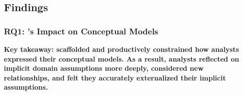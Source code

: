 \begin{comment}

\subsubsection{\evalStatisticalModels}
We used AIC, BIC, and R-squared values to assess how well statistical models
authored with vs. without rTisane fit the data. We used rTisane to statistically
model and assess the influence of rTisane on AIC, BIC, and R-squared values.

We also thematically analyzed participants' reactions to the similarities,
differences, and surprises between statistical models. 

\end{comment}

\subsection{Findings}
\subsubsection{RQ1: \rTisane's Impact on Conceptual Models}

\textbf{Key takeaway: \rTisane scaffolded and productively constrained how analysts expressed
their conceptual models. As a result, analysts reflected on implicit domain
assumptions more deeply, considered new relationships, and felt they
accurately externalized their implicit assumptions.}

